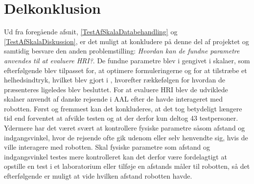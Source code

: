 \chapter{Delkonklusion}
\label{TestAfSkalaDelKonklusion}
%
Ud fra foregående afsnit, \autoref{TestAfSkalaDatabehandling} og \autoref{TestAfSkalaDiskussion}, er det muligt at konkludere på denne del af projektet og samtidig besvare den anden problemstilling: \textit{Hvordan kan de fundne parametre anvendes til at evaluere HRI?}. De fundne parametre blev i  gengivet i skalaer, som efterfølgende blev tilpasset for, at optimere formuleringerne og for at tilstræbe et helhedsindtryk, hvilket blev gjort i , hvorefter rækkefølgen for hvordan de præsenteres ligeledes blev besluttet. For at evaluere HRI blev de udviklede skalaer anvendt af danske rejsende i AAL efter de havde interageret med robotten.\blankline 
%
Først og fremmest kan det konkluderes, at det tog betydeligt længere tid end forventet at afvikle testen og at der derfor kun deltog 43 testpersoner. Ydermere har det været svært at kontrollere fysiske parametre såsom afstand og indgangsvinkel, hvor de rejsende ofte gik udenom eller selv henvendte sig, hvis de ville interagere med robotten. Skal fysiske parametre som afstand og indgangsvinkel testes mere kontrolleret kan det derfor være fordelagtigt at opstille en test i et laboratorium eller tilføje en afstands måler til robotten, så det efterfølgende er muligt at vide hvilken afstand robotten havde.

